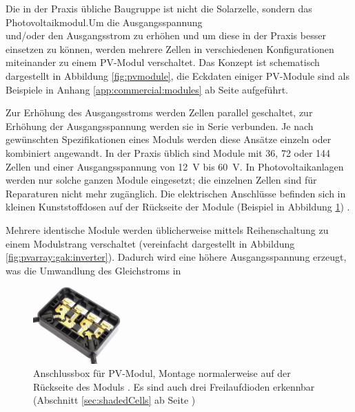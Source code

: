 Die  in der  Praxis  \"ubliche  Baugruppe ist  nicht  die Solarzelle,  sondern
das   Photovoltaikmodul.\hfill   Um   \hfill   die   \hfill   Ausgangsspannung
\\und/oder  den  Ausgangsstrom  zu  erh\"ohen  und  um  diese  in  der  Praxis
besser  einsetzen   zu  k\"onnen,  werden  mehrere   Zellen  in  verschiedenen
Konfigurationen  miteinander zu  einem PV-Modul  verschaltet. Das Konzept  ist
schematisch dargestellt in Abbildung  \ref{fig:pvmodule}, die Eckdaten einiger
PV-Module sind  als Beispiele in Anhang  \ref{app:commercial:modules} ab Seite
\pageref{app:commercial:modules} aufgef\"uhrt.

Zur  Erh\"ohung  des Ausgangsstroms  werden  Zellen  parallel geschaltet,  zur
Erh\"ohung  der  Ausgangsspannung werden  sie  in  Serie verbunden.   Je  nach
gew\"unschten Spezifikationen eines Moduls werden diese Ans\"atze einzeln oder
kombiniert angewandt.  In der Praxis \"ublich  sind Module mit 36, 72 oder 144
Zellen und  einer Ausgangsspannung  von \SI{12}{\volt}  bis \SI{60}{\volt}. In
Photovoltaikanlagen werden nur solche  ganzen Module eingesetzt; die einzelnen
Zellen  sind  f\"ur  Reparaturen  nicht  mehr  zug\"anglich. Die  elektrischen
Anschl\"usse befinden sich in kleinen  Kunststoffdosen auf der R\"uckseite der
Module (Beispiel in Abbildung \ref{fig:pvJunctionBox}) \cite{ref:pv:baunetz}.


Mehrere  identische  Module  werden  \"ublicherweise  mittels  Reihenschaltung
zu  einem  Modulstrang  verschaltet   (vereinfacht  dargestellt  in  Abbildung
\ref{fig:pvarray:gak:inverter}).  Dadurch wird  eine h\"ohere Ausgangsspannung
erzeugt, was die Umwandlung des Gleichstroms in

\begin{figure}
    \centering
    \includegraphics[width=0.3\textwidth]{images/solar-facility/pvJunctionBox.jpeg}
    \caption[Anschlussbox PV-Modul]{
        Anschlussbox   f\"ur   PV-Modul,   Montage   normalerweise   auf   der
        R\"uckseite  des  Moduls  \cite{ref:junctionBox}. Es  sind  auch  drei
        Freilaufdioden  erkennbar  (Abschnitt \ref{sec:shadedCells}  ab  Seite
        \pageref{sec:shadedCells})%
    }
    \label{fig:pvJunctionBox}
\end{figure}

